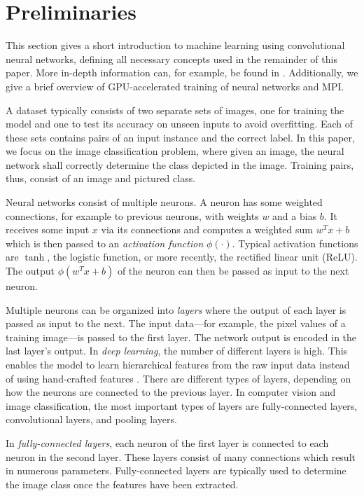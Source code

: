 \documentclass[conference,compsoc,a4paper]{IEEEtran}
\begin{document}

\section{Preliminaries} %
\label{sec:preliminaries}
This section gives a short introduction to machine learning using convolutional neural networks, defining all necessary concepts used in the remainder of this paper.
More in-depth information can, for example, be found in \cite{goodfellow2016-DeepLearningBook}.
Additionally, we give a brief overview of GPU-accelerated training of neural networks and MPI.

A dataset typically consists of two separate sets of images, one for training the model and one to test its accuracy on unseen inputs to avoid overfitting.
Each of these sets contains pairs of an input instance and the correct label.
In this paper, we focus on the image classification problem, where given an image, the neural network shall correctly determine the class depicted in the image.
Training pairs, thus, consist of an image and pictured class.

Neural networks consist of multiple neurons.
A neuron has some weighted connections, for example to previous neurons, with weights $w$ and a bias $b$.
It receives some input $x$ via its connections and computes a weighted sum $w^Tx+b$ which is then passed to an \emph{activation function} $\phi(\cdot)$.
Typical activation functions are $\tanh$, the logistic function, or more recently, the rectified linear unit (ReLU).
The output $\phi(w^Tx+b)$ of the neuron can then be passed as input to the next neuron.

Multiple neurons can be organized into \emph{layers} where the output of each layer is passed as input to the next.
The input data---for example, the pixel values of a training image---is passed to the first layer.
The network output is encoded in the last layer's output.
%
In \emph{deep learning}, the number of different layers is high.
This enables the model to learn hierarchical features from the raw input data instead of using hand-crafted features \cite{chilimbi2014-Project-Adam}.
%
There are different types of layers, depending on how the neurons are connected to the previous layer.
In computer vision and image classification, the most important types of layers are fully-connected layers, convolutional layers, and pooling layers.

In \emph{fully-connected layers}, each neuron of the first layer is connected to each neuron in the second layer.
These layers consist of many connections which result in numerous parameters.
Fully-connected layers are typically used to determine the image class once the features have been extracted.
\end{document}
